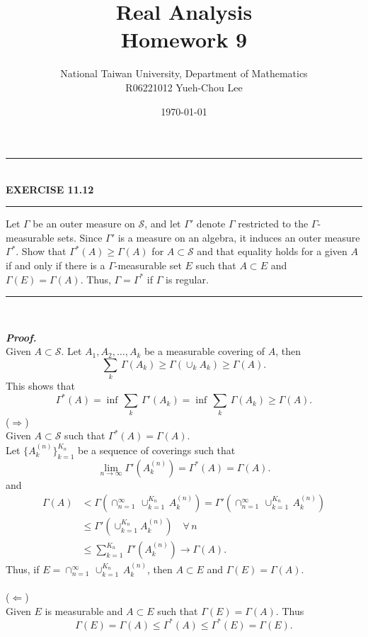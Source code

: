 \documentclass[a4paper,11pt]{article}
\title{Real Analysis\\ Homework 9}
\author{National Taiwan University, Department of Mathematics\\
R06221012 \hspace{0.2cm} Yueh-Chou Lee}
\date{\today}
\begin{document}
\maketitle

	\begin{flushleft}
		\rule[-0.5ex]{17cm}{2pt}\\
			\textbf{EXERCISE 11.12}\\
		\rule[1.5ex]{17cm}{0.5pt}
			Let $\Gamma$ be an outer measure on $\mathscr{S}$, and let $\Gamma'$ denote $\Gamma$ restricted to the $\Gamma$-measurable sets. Since $\Gamma'$ is a measure on an algebra, it induces an outer measure $\Gamma^*$. Show that $\Gamma^*(A) \geq \Gamma(A)$ for $A \subset \mathscr{S}$ and that equality holds for a given $A$ if and only if there is a $\Gamma$-measurable set $E$ such that $A \subset E$ and $\Gamma(E) = \Gamma(A)$. Thus, $\Gamma = \Gamma^*$ if $\Gamma$ is regular.
		\rule[1.0ex]{17cm}{0.5pt}\
	\end{flushleft}
	\textbf{\textit{Proof.}}\\
	Given $A \subset \mathscr{S}$. Let $A_1, A_2, \dots, A_k$ be a measurable covering of $A$, then
		$$\sum_k\,\Gamma(A_k) \geq \Gamma(\cup_k A_k) \geq \Gamma(A).$$
	This shows that
		$$\Gamma^* (A) = \inf\,\sum_k\,\Gamma'(A_k) = \inf\,\sum_k\,\Gamma(A_k) \geq \Gamma(A).$$
	($\Rightarrow$)\\
	Given $A \subset \mathscr{S}$ such that $\Gamma^*(A) = \Gamma(A)$.\\
	Let $\{A_k^{(n)}\}_{k=1}^{K_n}$ be a sequence of coverings such that
		$$\underset{n \to \infty}{\lim} \Gamma'(A_k^{(n)})
		= \Gamma^*(A)
		= \Gamma(A).$$
	and
		$$\begin{aligned}
		\Gamma(A)
		&< \Gamma \left(\cap_{n=1}^{\infty}\,\cup_{k=1}^{K_n}\,A_k^{(n)}\right)
		= \Gamma' \left(\cap_{n=1}^{\infty}\,\cup_{k=1}^{K_n}\,A_k^{(n)}\right)\\
		&\leq \Gamma' \left( \cup_{k=1}^{K_n} A_k^{(n)} \right)
		\quad \forall\,n\\
		&\leq \sum_{k=1}^{K_n}\,\Gamma'(A_k^{(n)}) \to \Gamma(A).
		\end{aligned}$$
	Thus, if $E = \cap_{n=1}^{\infty}\,\cup_{k=1}^{K_n}\,A_k^{(n)}$, then $A \subset E$ and $\Gamma(E) = \Gamma(A)$.\\\\
	($\Leftarrow$)\\
	Given $E$ is measurable and $A \subset E$ such that $\Gamma(E) = \Gamma(A)$. Thus
		$$\Gamma(E)
		= \Gamma(A)
		\leq \Gamma^*(A)
		\leq \Gamma^*(E)
		= \Gamma(E).$$
\end{document}
